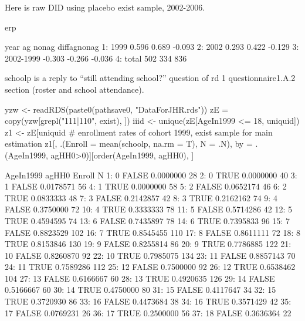 Here is raw DID using placebo \textsf{exist} sample, 2002-2006.
\begin{Schunk}
\begin{Sinput}
erp
\end{Sinput}
\begin{Soutput}
        year     ag  nonag diffagnonag
1:      1999  0.596  0.689      -0.093
2:      2002  0.293  0.422      -0.129
3: 2002-1999 -0.303 -0.266      -0.036
4:     total    502    334         836
\end{Soutput}
\end{Schunk}
\textsf{schoolp} is a reply to ``still attending school?'' question of rd 1 questionnaire1.A.2 section (roster and school attendance). 
\begin{Schunk}
\begin{Sinput}
yzw <- readRDS(paste0(pathsave0, "DataForJHR.rds"))
zE = copy(yzw[grepl("111|110", exist), ])
iiid <- unique(zE[AgeIn1999 <= 18, uniquid])
z1 <- zE[uniquid %in% iiid & survey != 2006 & sd == 1, ]
# enrollment rates of cohort 1999, exist sample for main estimation
z1[, .(Enroll = mean(schoolp, na.rm = T), N = .N), by = .(AgeIn1999, agHH0>0)][order(AgeIn1999, agHH0), ]
\end{Sinput}
\begin{Soutput}
    AgeIn1999 agHH0    Enroll   N
 1:         0 FALSE 0.0000000  28
 2:         0  TRUE 0.0000000  40
 3:         1 FALSE 0.0178571  56
 4:         1  TRUE 0.0000000  58
 5:         2 FALSE 0.0652174  46
 6:         2  TRUE 0.0833333  48
 7:         3 FALSE 0.2142857  42
 8:         3  TRUE 0.2162162  74
 9:         4 FALSE 0.3750000  72
10:         4  TRUE 0.3333333  78
11:         5 FALSE 0.5714286  42
12:         5  TRUE 0.4594595  74
13:         6 FALSE 0.7435897  78
14:         6  TRUE 0.7395833  96
15:         7 FALSE 0.8823529 102
16:         7  TRUE 0.8545455 110
17:         8 FALSE 0.8611111  72
18:         8  TRUE 0.8153846 130
19:         9 FALSE 0.8255814  86
20:         9  TRUE 0.7786885 122
21:        10 FALSE 0.8260870  92
22:        10  TRUE 0.7985075 134
23:        11 FALSE 0.8857143  70
24:        11  TRUE 0.7589286 112
25:        12 FALSE 0.7500000  92
26:        12  TRUE 0.6538462 104
27:        13 FALSE 0.6166667  60
28:        13  TRUE 0.4920635 126
29:        14 FALSE 0.5166667  60
30:        14  TRUE 0.4750000  80
31:        15 FALSE 0.4117647  34
32:        15  TRUE 0.3720930  86
33:        16 FALSE 0.4473684  38
34:        16  TRUE 0.3571429  42
35:        17 FALSE 0.0769231  26
36:        17  TRUE 0.2500000  56
37:        18 FALSE 0.3636364  22

\end{Soutput}
\end{Schunk}
